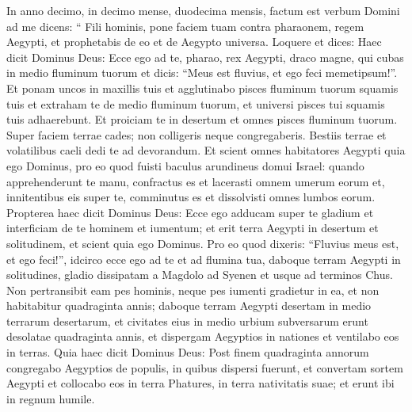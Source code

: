 \begin{biblechapter}
\begin{biblechapter}
\begin{biblechapter}
\begin{biblechapter}
\begin{biblechapter}
\begin{biblechapter}
\begin{biblechapter}
\begin{biblechapter}
\begin{biblechapter}
\begin{biblechapter}
\begin{biblechapter}
\begin{biblechapter}
\begin{biblechapter}
\begin{biblechapter}
\begin{biblechapter}
\begin{biblechapter}
\begin{biblechapter}
\begin{biblechapter}
\begin{biblechapter}
\begin{biblechapter}
\begin{biblechapter}
\begin{biblechapter}
\begin{biblechapter}
\begin{biblechapter}
\begin{biblechapter}
\begin{biblechapter}
\begin{biblechapter}
\begin{biblechapter}
\begin{biblechapter}
\verse In anno decimo, in decimo mense, duodecima mensis, factum est verbum Domini ad me dicens: 
\verse “ Fili hominis, pone faciem tuam contra pharaonem, regem Aegypti, et prophetabis de eo et de Aegypto universa. 
\verse Loquere et dices: Haec dicit Dominus Deus:
 Ecce ego ad te, pharao,
 rex Aegypti,
 draco magne, qui cubas
 in medio fluminum tuorum
 et dicis: “Meus est fluvius,
 et ego feci memetipsum!”.
 \verse Et ponam uncos in maxillis tuis
 et agglutinabo pisces fluminum tuorum squamis tuis
 et extraham te de medio fluminum tuorum,
 et universi pisces tui squamis tuis adhaerebunt.
 \verse Et proiciam te in desertum
 et omnes pisces fluminum tuorum.
 Super faciem terrae cades;
 non colligeris neque congregaberis.
 Bestiis terrae et volatilibus caeli
 dedi te ad devorandum.
 \verse Et scient omnes habitatores Aegypti
 quia ego Dominus,
 pro eo quod fuisti baculus arundineus
 domui Israel:
 \verse quando apprehenderunt te manu,
 confractus es et lacerasti omnem umerum eorum
 et, innitentibus eis super te,
 comminutus es
 et dissolvisti omnes lumbos eorum.
 \verse Propterea haec dicit Dominus Deus: Ecce ego adducam super te gladium et interficiam de te hominem et iumentum; 
\verse et erit terra Aegypti in desertum et solitudinem, et scient quia ego Dominus. Pro eo quod dixeris: “Fluvius meus est, et ego feci!”, 
\verse idcirco ecce ego ad te et ad flumina tua, daboque terram Aegypti in solitudines, gladio dissipatam a Magdolo ad Syenen et usque ad terminos Chus. 
\verse Non pertransibit eam pes hominis, neque pes iumenti gradietur in ea, et non habitabitur quadraginta annis; 
\verse daboque terram Aegypti desertam in medio terrarum desertarum, et civitates eius in medio urbium subversarum erunt desolatae quadraginta annis, et dispergam Aegyptios in nationes et ventilabo eos in terras.
 \verse Quia haec dicit Dominus Deus: Post finem quadraginta annorum congregabo Aegyptios de populis, in quibus dispersi fuerunt, 
\verse et convertam sortem Aegypti et collocabo eos in terra Phatures, in terra nativitatis suae; et erunt ibi in regnum humile. 

\end{biblechapter}
\end{biblechapter}
\end{biblechapter}
\end{biblechapter}
\end{biblechapter}
\end{biblechapter}
\end{biblechapter}
\end{biblechapter}
\end{biblechapter}
\end{biblechapter}
\end{biblechapter}
\end{biblechapter}
\end{biblechapter}
\end{biblechapter}
\end{biblechapter}
\end{biblechapter}
\end{biblechapter}
\end{biblechapter}
\end{biblechapter}
\end{biblechapter}
\end{biblechapter}
\end{biblechapter}
\end{biblechapter}
\end{biblechapter}
\end{biblechapter}
\end{biblechapter}
\end{biblechapter}
\end{biblechapter}
\end{biblechapter}
